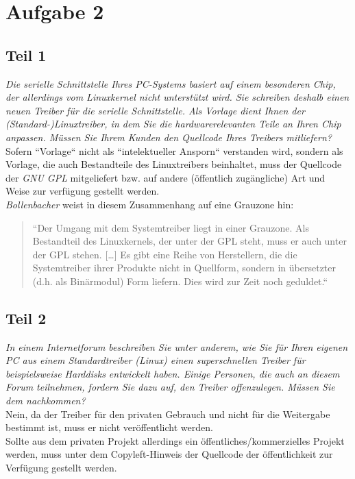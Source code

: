 \chapter{Aufgabe 2}

\section{Teil 1}

\textit{Die serielle Schnittstelle Ihres PC-Systems basiert auf einem besonderen Chip, der allerdings vom Linuxkernel nicht unterstützt wird. Sie
schreiben deshalb einen neuen Treiber für die serielle Schnittstelle. Als
Vorlage dient Ihnen der (Standard-)Linuxtreiber, in dem Sie die hardwarerelevanten Teile an Ihren Chip anpassen.
Müssen Sie Ihrem Kunden den Quellcode Ihres Treibers mitliefern?}\\

\noindent
Sofern ``Vorlage`` nicht als ``intelektueller Ansporn`` verstanden wird, sondern als Vorlage, die auch Bestandteile des Linuxtreibers beinhaltet, muss der Quellcode der \textit{GNU GPL} mitgeliefert bzw. auf andere (öffentlich zugängliche) Art und Weise zur verfügung gestellt werden.\\
\textit{Bollenbacher} weist in diesem Zusammenhang auf eine Grauzone hin:

\blockquote[{\cite[184]{ES4}}]{
    ``Der Umgang mit dem Systemtreiber liegt in einer Grauzone. Als Bestandteil des Linuxkernels, der unter der GPL steht, muss er auch unter
    der GPL stehen. [\ldots] Es gibt eine Reihe von Herstellern, die die Systemtreiber ihrer Produkte nicht in Quellform, sondern in übersetzter
    (d.h. als Binärmodul) Form liefern. Dies wird zur Zeit noch geduldet.``

}

\section{Teil 2}

\textit{In einem Internetforum beschreiben Sie unter anderem, wie Sie für Ihren eigenen PC aus einem Standardtreiber (Linux) einen superschnellen
Treiber für beispielsweise Harddisks entwickelt haben.
Einige Personen, die auch an diesem Forum teilnehmen, fordern Sie
dazu auf, den Treiber offenzulegen.
Müssen Sie dem nachkommen?}\\

\noindent
Nein, da der Treiber für den privaten Gebrauch und nicht für die Weitergabe bestimmt ist, muss er nicht veröffentlicht werden.\\
Sollte aus dem privaten Projekt allerdings ein öffentliches/kommerzielles Projekt werden, muss unter dem Copyleft-Hinweis der Quellcode der öffentlichkeit zur Verfügung gestellt werden.

